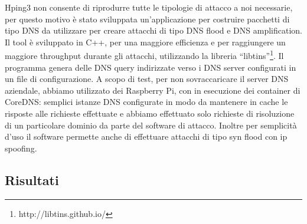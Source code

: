 Hping3 non consente di riprodurre tutte le tipologie di attacco a noi necessarie, per questo motivo è stato sviluppata un'applicazione per costruire pacchetti di tipo DNS da utilizzare per creare attacchi di tipo DNS flood e DNS amplification.
Il tool è sviluppato in C++, per una maggiore efficienza e per raggiungere un maggiore throughput durante gli attacchi, utilizzando la libreria ``libtins''\footnote{ http://libtins.github.io/}.
Il programma genera delle DNS query indirizzate verso i DNS server configurati in un file di configurazione. A scopo di test, per non sovraccaricare il server DNS aziendale, abbiamo utilizzato dei Raspberry Pi, con in esecuzione dei container di CoreDNS: semplici istanze DNS configurate in modo da mantenere in cache le risposte alle richieste effettuate e abbiamo effettuato solo richieste di risoluzione di un particolare dominio da parte del software di attacco.
Inoltre per semplicità d'uso il software permette anche di effettuare attacchi di tipo syn flood con ip spoofing.


\subsection{Risultati}
